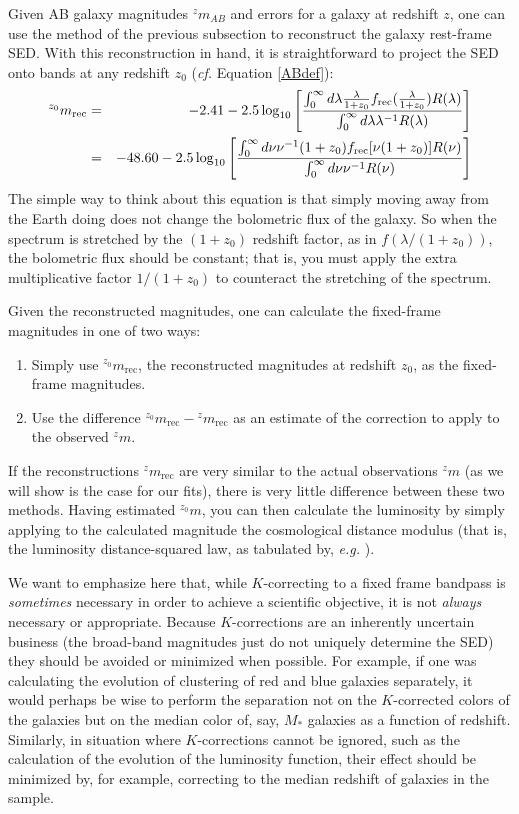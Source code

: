 \documentclass[10pt,preprint]{aastex}
\newcommand{\band}[2]{\ensuremath{^{#1}{#2}}}
\begin{document}
Given AB galaxy magnitudes $^{z}m_{AB}$ and errors for a galaxy at
redshift $z$, one can use the method of the previous subsection to
reconstruct the galaxy rest-frame SED.  With this reconstruction in
hand, it is straightforward to project the SED onto bands at any
redshift $z_0$ ({\it cf.} Equation \ref{ABdef}):
\begin{eqnarray}
^{z_0}m_{\mathrm{rec}} &=& -2.41 - 2.5 \log_{10}\left[
\frac{\int_{0}^{\infty} d\lambda \frac{\lambda}{1+z_0}
f_{\mathrm{rec}}(\frac{\lambda}{1+z_0}) R(\lambda)}
{\int_{0}^{\infty} d\lambda \lambda^{-1} R(\lambda)}\right] \cr
&=& -48.60 - 2.5 \log_{10}\left[
\frac{\int_{0}^{\infty} d\nu \nu^{-1} (1+z_0)
f_{\mathrm{rec}}[\nu (1+z_0)] R(\nu)}
{\int_{0}^{\infty} d\nu \nu^{-1} R(\nu)}\right] 
\end{eqnarray}
The simple way to think about this equation is that simply moving away
from the Earth doing does not change the bolometric flux of the
galaxy. So when the spectrum is stretched by the $(1+z_0)$ redshift
factor, as in $f(\lambda/(1+z_0))$, the bolometric flux should be
constant; that is, you must apply the extra multiplicative factor
$1/(1+z_0)$ to counteract the stretching of the spectrum. 

Given the reconstructed magnitudes, one can calculate the fixed-frame
magnitudes in one of two ways:
\begin{enumerate}
\item Simply use $\band{z_0}{m_{\mathrm{rec}}}$, the reconstructed
magnitudes at redshift $z_0$, as the fixed-frame magnitudes.
\item Use the difference
$\band{z_0}{m_{\mathrm{rec}}}-\band{z}{m_{\mathrm{rec}}}$ as an
estimate of the correction to apply to the observed $\band{z}{m}$.
\end{enumerate}
If the reconstructions $\band{z}{m_{\mathrm{rec}}}$ are very similar
to the actual observations $\band{z}{m}$ (as we will show is the case
for our fits), there is very little difference between these two
methods. Having estimated $\band{z_0}{m}$, you can then calculate the
luminosity by simply applying to the calculated magnitude the
cosmological distance modulus (that is, the luminosity
distance-squared law, as tabulated by, {\it e.g.}  \citealt{hogg99a}).

We want to emphasize here that, while $K$-correcting to a fixed frame
bandpass is {\it sometimes} necessary in order to achieve a scientific
objective, it is not {\it always} necessary or appropriate. Because
$K$-corrections are an inherently uncertain business (the broad-band
magnitudes just do not uniquely determine the SED) they should be
avoided or minimized when possible. For example, if one was calculating
the evolution of clustering of red and blue galaxies separately, it
would perhaps be wise to perform the separation not on the
$K$-corrected colors of the galaxies but on the median color of, say,
$M_\ast$ galaxies as a function of redshift. Similarly, in situation
where $K$-corrections cannot be ignored, such as the calculation of
the evolution of the luminosity function, their effect should be
minimized by, for example, correcting to the median redshift of
galaxies in the sample.
\end{document}
